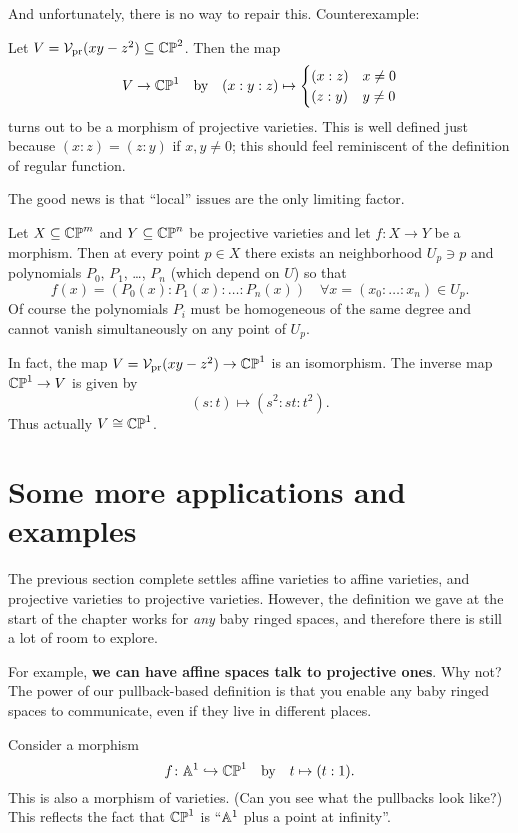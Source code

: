 And unfortunately, there is no way to repair this.
Counterexample:
\begin{example}
	Let $V = \mathcal V_{\text{pr}}(xy-z^2) \subseteq \mathbb{CP}^2$.
	Then the map
	\[
		V \to \mathbb{CP}^1
		\quad\text{by}\quad
		(x:y:z)
		\mapsto
		\begin{cases}
			(x:z) & x \neq 0 \\
			(z:y) & y \neq 0
		\end{cases}
	\]
	turns out to be a morphism of projective varieties.
	This is well defined just because $(x:z) = (z:y)$ if $x,y \neq 0$;
	this should feel reminiscent of the definition of regular function.
\end{example}
The good news is that ``local'' issues are the only limiting factor.
\begin{theorem}
	Let $X \subseteq \mathbb{CP}^m$ and $Y \subseteq \mathbb{CP}^n$ be projective varieties
	and let $f : X \to Y$ be a morphism.
	Then at every point $p \in X$ there exists an neighborhood $U_p \ni p$
	and polynomials $P_0$, $P_1$, \dots, $P_n$ (which depend on $U$) so that
	\[ f(x) = \left( P_0(x) : P_1(x) : \dots : P_n(x) \right)
		\quad \forall x = (x_0 : \dots : x_n) \in U_p. \]
	Of course the polynomials $P_i$ must be homogeneous of the same degree
	and cannot vanish simultaneously on any point of $U_p$.
\end{theorem}
\begin{example}
	In fact, the map $V = \mathcal V_{\text{pr}}(xy-z^2) \to \mathbb{CP}^1$ is an isomorphism.
	The inverse map $\mathbb{CP}^1 \to V$ is given by 
	\[ (s:t) \mapsto (s^2:st:t^2). \]
	Thus actually $V \cong \mathbb{CP}^1$.
\end{example}

\section{Some more applications and examples}
The previous section complete settles affine varieties to affine varieties,
and projective varieties to projective varieties.
However, the definition we gave at the start of the chapter
works for \emph{any} baby ringed spaces,
and therefore there is still a lot of room to explore.

For example, \textbf{we can have affine spaces talk to projective ones}.
Why not?
The power of our pullback-based definition
is that you enable any baby ringed spaces to communicate,
even if they live in different places.
\begin{example}
	Consider a morphism
	\[ f \colon \mathbb A^1 \hookrightarrow \mathbb{CP}^1 \quad\text{by}\quad t \mapsto (t:1).  \]
	This is also a morphism of varieties.
	(Can you see what the pullbacks look like?)
	This reflects the fact that $\mathbb{CP}^1$ is ``$\mathbb A^1$ plus a point at infinity''.
\end{example}

